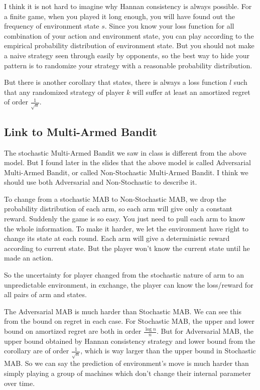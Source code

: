 \documentclass{article} %
\begin{document}
I think it is not hard to imagine why Hannan consistency is always possible. For a finite game, when you played it long enough, you will have found out the frequency of environment state $s$. Since you know your loss function for all combination of your action and environment state, you can play according to the empirical probability distribution of environment state. But you should not make a naive strategy seen through easily by opponents, so the best way to hide your pattern is to randomize your strategy with a reasonable probability distribution.

But there is another corollary that states, there is always a loss function $l$ such that any randomized strategy of player $k$ will suffer at least an amortized regret of order $\frac{1}{\sqrt{n}}$.



\subsection{Link to Multi-Armed Bandit}
The stochastic Multi-Armed Bandit we saw in class is different from the above model. But I found later in the slides that the above model is called Adversarial Multi-Armed Bandit, or called Non-Stochastic Multi-Armed Bandit. I think we should use both Adversarial and Non-Stochastic to describe it. 

To change from a stochastic MAB to Non-Stochastic MAB, we drop the probability distribution of each arm, so each arm will give only a constant reward. Suddenly the game is so easy. You just need to pull each arm to know the whole information. To make it harder, we let the environment have right to change its state at each round. Each arm will give a deterministic reward according to current state. But the player won't know the current state until he made an action.

So the uncertainty for player changed from the stochastic nature of arm to an unpredictable environment, in exchange, the player can know the loss/reward for all pairs of arm and states.

The Adversarial MAB is much harder than Stochastic MAB. We can see this from the bound on regret in each case. For Stochastic MAB, the upper and lower bound on amortized regret are both in order $\frac{\log{n}}{n}$. But for Adversarial MAB, the upper bound obtained by Hannan consistency strategy and lower bound from the corollary are of order $\frac{1}{\sqrt{n}}$, which is way larger than the upper bound in Stochastic MAB. So we can say the prediction of environment's move is much harder than simply  playing a group of machines which don't change their internal parameter over time.
\end{document}
